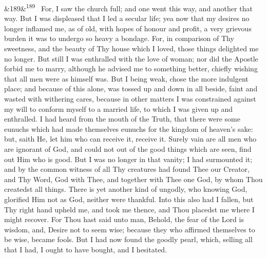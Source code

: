 \documentclass[12pt]{article}
\newcommand{\para}[1][]{\par\noindent\ifx&#1&\else\textsuperscript{\footnotesize #1}~\fi}
\begin{document}
\para[189] For, I saw the church full; and one went this way, and another that way. But I was displeased that I led a secular life; yea now that my desires no longer inflamed me, as of old, with hopes of honour and profit, a very grievous burden it was to undergo so heavy a bondage. For, in comparison of Thy sweetness, and the beauty of Thy house which I loved, those things delighted me no longer. But still I was enthralled with the love of woman; nor did the Apostle forbid me to marry, although he advised me to something better, chiefly wishing that all men were as himself was. But I being weak, chose the more indulgent place; and because of this alone, was tossed up and down in all beside, faint and wasted with withering cares, because in other matters I was constrained against my will to conform myself to a married life, to which I was given up and enthralled. I had heard from the mouth of the Truth, that there were some eunuchs which had made themselves eunuchs for the kingdom of heaven's sake: but, saith He, let him who can receive it, receive it. Surely vain are all men who are ignorant of God, and could not out of the good things which are seen, find out Him who is good. But I was no longer in that vanity; I had surmounted it; and by the common witness of all Thy creatures had found Thee our Creator, and Thy Word, God with Thee, and together with Thee one God, by whom Thou createdst all things. There is yet another kind of ungodly, who knowing God, glorified Him not as God, neither were thankful. Into this also had I fallen, but Thy right hand upheld me, and took me thence, and Thou placedst me where I might recover. For Thou hast said unto man, Behold, the fear of the Lord is wisdom, and, Desire not to seem wise; because they who affirmed themselves to be wise, became fools. But I had now found the goodly pearl, which, selling all that I had, I ought to have bought, and I hesitated.
\end{document}
